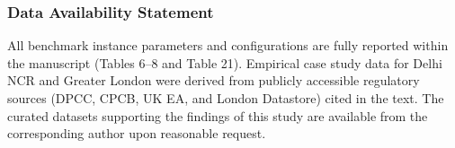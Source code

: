 \documentclass[11pt, a4paper]{article}
\begin{document}
\subsubsection*{Data Availability Statement}
\footnotesize All benchmark instance parameters and configurations are fully reported within the manuscript (Tables 6–8 and Table 21). Empirical case study data for Delhi NCR and Greater London were derived from publicly accessible regulatory sources (DPCC, CPCB, UK EA, and London Datastore) cited in the text. The curated datasets supporting the findings of this study are available from the corresponding author upon reasonable request.


\end{document}
